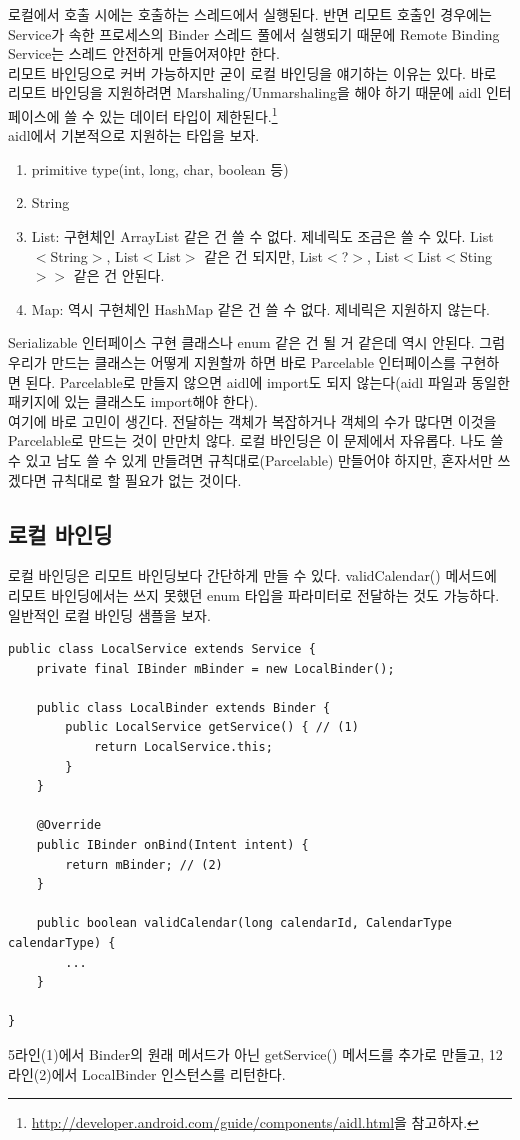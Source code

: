 로컬에서 호출 시에는 호출하는 스레드에서 실행된다. 반면 리모트 호출인 경우에는 Service가 속한 프로세스의 Binder 스레드 풀에서 실행되기 때문에 Remote Binding Service는 스레드 안전하게 만들어져야만 한다.\\

리모트 바인딩으로 커버 가능하지만 굳이 로컬 바인딩을 얘기하는 이유는 있다. 바로 리모트 바인딩을 지원하려면 Marshaling/Unmarshaling을 해야 하기 때문에 
aidl 인터페이스에 쓸 수 있는 데이터 타입이 제한된다.\footnote{\url{http://developer.android.com/guide/components/aidl.html}을 참고하자.}\\

aidl에서 기본적으로 지원하는 타입을 보자. 
\begin{enumerate}
\item primitive type(int, long, char, boolean 등)
\item String
\item List: 구현체인 ArrayList 같은 건 쓸 수 없다. 제네릭도 조금은 쓸 수 있다. List$<$String$>$, List$<$List$>$ 같은 건 되지만, List$<$?$>$, List$<$List$<$Sting$>>$ 같은 건 안된다.
\item Map: 역시 구현체인 HashMap 같은 건 쓸 수 없다. 제네릭은 지원하지 않는다.
\end{enumerate}
Serializable 인터페이스 구현 클래스나 enum 같은 건 될 거 같은데 역시 안된다.
그럼 우리가 만드는 클래스는 어떻게 지원할까 하면 바로 Parcelable 인터페이스를 구현하면 된다. 
Parcelable로 만들지 않으면 aidl에 import도 되지 않는다(aidl 파일과 동일한 패키지에 있는 클래스도 import해야 한다).\\

여기에 바로 고민이 생긴다. 전달하는 객체가 복잡하거나 객체의 수가 많다면 이것을 Parcelable로 만드는 것이 만만치 않다.
로컬 바인딩은 이 문제에서 자유롭다. 나도 쓸 수 있고 남도 쓸 수 있게 만들려면 규칙대로(Parcelable) 만들어야 하지만, 혼자서만 쓰겠다면 규칙대로 할 필요가 없는 것이다.\\

\subsection{로컬 바인딩}
로컬 바인딩은 리모트 바인딩보다 간단하게 만들 수 있다.
validCalendar() 메서드에 리모트 바인딩에서는 쓰지 못했던 enum 타입을 파라미터로 전달하는 것도 가능하다. 
일반적인 로컬 바인딩 샘플을 보자.
\begin{lstlisting}[frame=single]
public class LocalService extends Service {
	private final IBinder mBinder = new LocalBinder();

	public class LocalBinder extends Binder {
		public LocalService getService() { // (1)
			return LocalService.this;
		}
	}

	@Override
	public IBinder onBind(Intent intent) {
		return mBinder; // (2)
	}

	public boolean validCalendar(long calendarId, CalendarType calendarType) {
		...
	}

}
\end{lstlisting}
5라인(1)에서 Binder의 원래 메서드가 아닌 getService() 메서드를 추가로 만들고, 12라인(2)에서 LocalBinder 인스턴스를 리턴한다.\\

